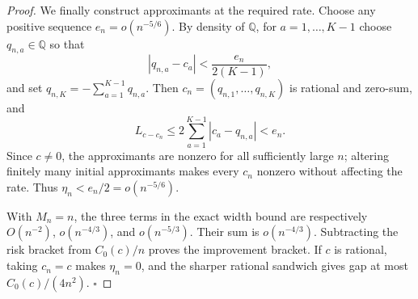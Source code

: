 \documentclass{article}
\begin{document}
\begin{proof}
We finally construct approximants at the required rate.  Choose any positive sequence \(e_n=o(n^{-5/6})\).  By density of \(\mathbb Q\), for \(a=1,\ldots,K-1\) choose \(q_{n,a}\in\mathbb Q\) so that
\[
 |q_{n,a}-c_a|<\frac{e_n}{2(K-1)},
\]
and set \(q_{n,K}=-\sum_{a=1}^{K-1}q_{n,a}\).  Then \(c_n=(q_{n,1},\ldots,q_{n,K})\) is rational and zero-sum, and
\[
 L_{c-c_n}\leq2\sum_{a=1}^{K-1}|c_a-q_{n,a}|<e_n.
\]
Since \(c\neq0\), the approximants are nonzero for all sufficiently large \(n\); altering finitely many initial approximants makes every \(c_n\) nonzero without affecting the rate.  Thus \(\eta_n<e_n/2=o(n^{-5/6})\).

With \(M_n=n\), the three terms in the exact width bound are respectively \(O(n^{-2})\), \(o(n^{-4/3})\), and \(o(n^{-5/3})\).  Their sum is \(o(n^{-4/3})\).  Subtracting the risk bracket from \(C_0(c)/n\) proves the improvement bracket.  If \(c\) is rational, taking \(c_n=c\) makes \(\eta_n=0\), and the sharper rational sandwich gives gap at most \(C_0(c)/(4n^2)\). \(\square\)
\end{proof}
\end{document}

